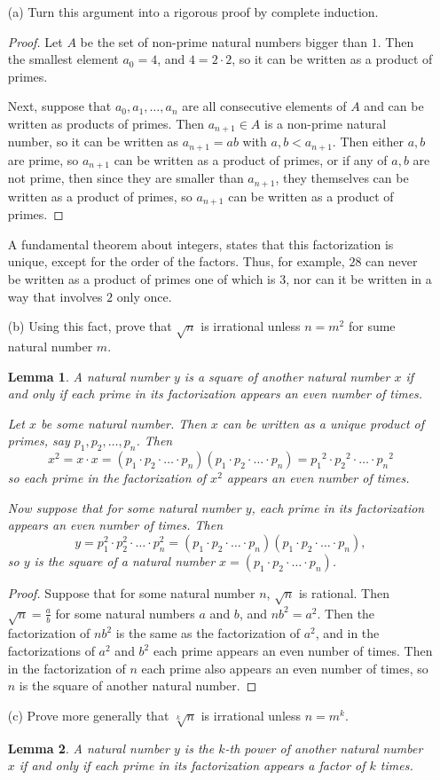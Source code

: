 \documentclass{article}
\newtheorem*{lemma}{Lemma}
\begin{document}
\begin{enumerate}
	\item[(a)] Turn this argument into a rigorous proof by complete induction.
	\begin{proof}
		Let $A$ be the set of non-prime natural numbers bigger than $1$. Then the smallest element $a_0 = 4$, and $4 = 2 \cdot 2$, so it can be written as a product of primes.

		Next, suppose that $a_0, a_1, \dots, a_n$ are all consecutive elements of $A$ and can be written as products of primes. Then $a_{n + 1} \in A$ is a non-prime natural number, so it can be written as $a_{n + 1} = ab$ with $a,b < a_{n + 1}$. Then either $a,b$ are prime, so $a_{n + 1}$ can be written as a product of primes, or if any of $a, b$ are not prime, then since they are smaller than $a_{n + 1}$, they themselves can be written as a product of primes, so $a_{n + 1}$ can be written as a product of primes.
	\end{proof}
	A fundamental theorem about integers, states that this factorization is unique, except for the order of the factors. Thus, for example, $28$ can never be written as a product of primes one of which is $3$, nor can it be written in a way that involves $2$ only once.
	\item[(b)] Using this fact, prove that $\sqrt{n}$ is irrational unless $n = m^2$ for sume natural number $m$.
	\begin{lemma}
		A natural number $y$ is a square of another natural number $x$ if and only if each prime in its factorization appears an even number of times.
		
		Let $x$ be some natural number. Then $x$ can be written as a unique product of primes, say $p_1, p_2, \dots, p_n$. Then \[x^2 = x \cdot x = (p_1 \cdot p_2 \cdot \dots \cdot p_n)(p_1 \cdot p_2 \cdot \dots \cdot p_n) = {p_1}^2 \cdot {p_2}^2 \cdot \dots \cdot {p_n}^2\]so each prime in the factorization of $x^2$ appears an even number of times.

		Now suppose that for some natural number $y$, each prime in its factorization appears an even number of times. Then \[y = p_1^2 \cdot p_2^2 \cdot \dots \cdot p_n^2 = (p_1 \cdot p_2 \cdot \dots \cdot p_n)(p_1 \cdot p_2 \cdot \dots \cdot p_n),\] so $y$ is the square of a natural number $x = (p_1 \cdot p_2 \cdot \dots \cdot p_n)$.
	\end{lemma}
	\begin{proof}
		Suppose that for some natural number $n$, $\sqrt{n}$ is rational. Then $\sqrt{n} = \frac{a}{b}$ for some natural numbers $a$ and $b$, and $nb^2 = a^2$. Then the factorization of $nb^2$ is the same as the factorization of $a^2$, and in the factorizations of $a^2$ and $b^2$ each prime appears an even number of times. Then in the factorization of $n$ each prime also appears an even number of times, so $n$ is the square of another natural number.
	\end{proof}
	\item[(c)] Prove more generally that $\sqrt[k]{n}$ is irrational unless $n = m^k$.
	\begin{lemma}
		A natural number $y$ is the $k$-th power of another natural number $x$ if and only if each prime in its factorization appears a factor of $k$ times.


\end{lemma}
\end{enumerate}
\end{document}
